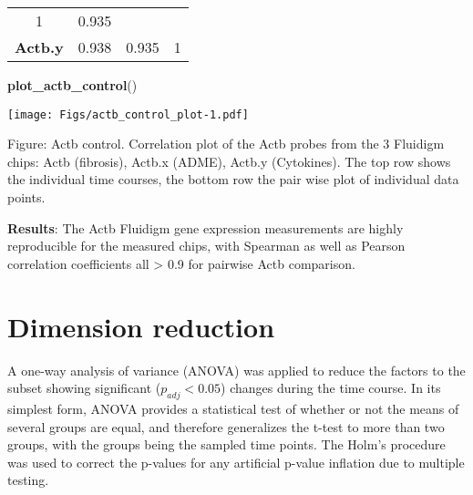 \documentclass[]{article}
\newenvironment{Shaded}{\begin{snugshade}}{\end{snugshade}}
\newcommand{\KeywordTok}[1]{\textcolor[rgb]{0.13,0.29,0.53}{\textbf{{#1}}}}
\newcommand{\NormalTok}[1]{{#1}}
\begin{document}
\begin{longtable}[c]{@{}cccc@{}}
\begin{minipage}[t]{0.11\columnwidth}
1
\strut\end{minipage} &
\begin{minipage}[t]{0.11\columnwidth}\centering\strut
0.935
\strut\end{minipage}\tabularnewline
\begin{minipage}[t]{0.16\columnwidth}\centering\strut
\textbf{Actb.y}
\strut\end{minipage} &
\begin{minipage}[t]{0.09\columnwidth}\centering\strut
0.938
\strut\end{minipage} &
\begin{minipage}[t]{0.11\columnwidth}\centering\strut
0.935
\strut\end{minipage} &
\begin{minipage}[t]{0.11\columnwidth}\centering\strut
1
\strut\end{minipage}\tabularnewline
\bottomrule
\end{longtable}

\begin{Shaded}
\begin{Highlighting}[]
\KeywordTok{plot_actb_control}\NormalTok{()}
\end{Highlighting}
\end{Shaded}

\texttt{[image: Figs/actb\_control\_plot-1.pdf]}

Figure: Actb control. Correlation plot of the Actb probes from the 3
Fluidigm chips: Actb (fibrosis), Actb.x (ADME), Actb.y (Cytokines). The
top row shows the individual time courses, the bottom row the pair wise
plot of individual data points.

\textbf{Results}: The Actb Fluidigm gene expression measurements are
highly reproducible for the measured chips, with Spearman as well as
Pearson correlation coefficients all \textgreater{} 0.9 for pairwise
Actb comparison.

\section{Dimension reduction}\label{dimension-reduction}

A one-way analysis of variance (ANOVA) was applied to reduce the factors
to the subset showing significant (\(p_{adj}< 0.05\)) changes during the
time course. In its simplest form, ANOVA provides a statistical test of
whether or not the means of several groups are equal, and therefore
generalizes the t-test to more than two groups, with the groups being
the sampled time points. The Holm's procedure was used to correct the
p-values for any artificial p-value inflation due to multiple testing.
\end{document}
